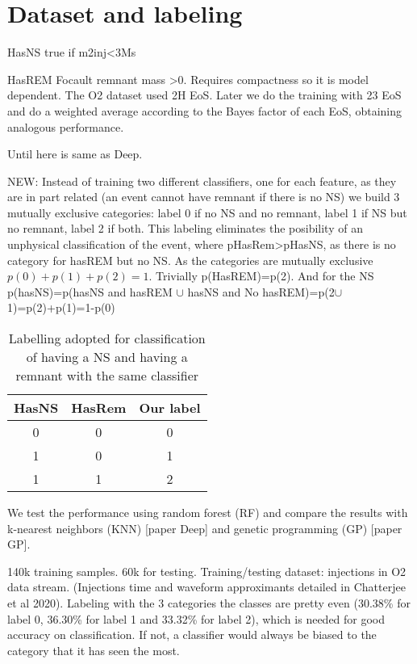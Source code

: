 \section{Dataset and labeling}
\label{sec:dataset}
HasNS true if m2inj<3Ms

HasREM Focault remnant mass >0. Requires compactness so it is model dependent. The O2 dataset used 2H EoS. Later we do the training with 23 EoS and do a weighted average according to the Bayes factor of each EoS, obtaining analogous performance.

Until here is same as Deep.

NEW: Instead of training two different classifiers, one for each feature, as they are in part related (an event cannot have remnant if there is no NS) we build 3 mutually exclusive categories: label 0 if no NS and no remnant, label 1 if NS but no remnant, label 2 if both. This labeling eliminates the posibility of an unphysical classification of the event, where pHasRem>pHasNS, as there is no category for hasREM but no NS. As the categories are mutually exclusive $p(0)+p(1)+p(2)=1$. Trivially p(HasREM)=p(2). And for the NS
p(hasNS)=p(hasNS and hasREM $\cup$ hasNS and No hasREM)=p(2$\cup$1)=p(2)+p(1)=1-p(0)


\begin{table}[h]
\centering
\begin{tabular}{@{}ccc@{}}
\toprule
HasNS & HasRem & Our label \\ \midrule
0     & 0      & 0         \\
1     & 0      & 1         \\
1     & 1      & 2         \\ \bottomrule
\end{tabular}
\caption{Labelling adopted for classification of having a NS and having a remnant with the same classifier}
\label{tab:labels}
\end{table}

We test the performance using random forest (RF) and compare the results with k-nearest neighbors (KNN) [paper Deep] and genetic programming (GP) [paper GP].

140k training samples. 60k for testing. Training/testing dataset: injections in O2 data stream. (Injections time and waveform approximants detailed in Chatterjee et al 2020). Labeling with the 3 categories the classes are pretty even (30.38\% for label 0, 36.30\% for label 1 and 33.32\% for label 2), which is needed for good accuracy on classification. If not, a classifier would always be biased to the category that it has seen the most. 
